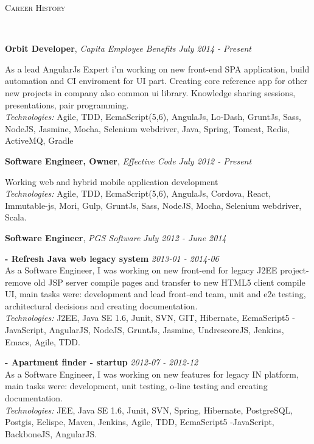 \documentclass[9pt]{article}
\newenvironment{changemargin}[2]{%
  \begin{list}{}{%
      \setlength{\topsep}{0pt}%
      \setlength{\leftmargin}{#1}%
      \setlength{\rightmargin}{#2}%
      \setlength{\listparindent}{\parindent}%
      \setlength{\itemindent}{\parindent}%
      \setlength{\parsep}{\parskip}%
    }%
  \item[]}{\end{list}
}
\newcommand{\lineover}{
  \begin{changemargin}{-0.05in}{-0.05in}
    \vspace*{-8pt}
    \hrulefill \\
    \vspace*{-2pt}
  \end{changemargin}
}
\newcommand{\header}[1]{
	\begin{changemargin}{-0.5in}{-0.5in}
		\scshape{#1}\\
  	\lineover
	\end{changemargin}
}
\newcommand{\jobtitle}[3]{
	\textbf{#1}, \emph{#2} \hfill \emph{#3}\\
}
\newcommand{\jobdescription}[1]{
	\begin{changemargin}{0.15in}{0.15in}
    \smallskip
		{#1}
    \medskip
	\end{changemargin}
}
\newenvironment{body} {
	\vspace*{-16pt}
	\begin{changemargin}{-0.25in}{-0.5in}
  }
	{\end{changemargin}
}
\begin{document}
\header{Career History}
\begin{body}
  \vspace{14pt}


  \jobtitle{Orbit Developer}{Capita Employee Benefits}{July 2014 - Present}
  \jobdescription{
    As a lead AngularJs Expert i'm working on new front-end SPA application, build automation and CI enviroment for UI part.
    Creating core reference app for other new projects in company also common ui library.
    Knowledge sharing sessions, presentations, pair programming.\\
    \emph{Technologies:} Agile, TDD, EcmaScript(5,6), AngulaJs, Lo-Dash, GruntJs, Sass, NodeJS, Jasmine, Mocha, Selenium webdriver, Java, Spring, Tomcat,  Redis, ActiveMQ, Gradle
  }

  \jobtitle{Software Engineer, Owner}{Effective Code}{July 2012 - Present}
  \jobdescription{
    Working web and hybrid mobile application development\\
    \emph{Technologies:} Agile, TDD, EcmaScript(5,6), AngulaJs, Cordova, React, Immutable-js, Mori, Gulp, GruntJs, Sass, NodeJS, Mocha, Selenium webdriver, Scala.
  }

  \jobtitle{Software Engineer}{PGS Software}{July 2012 - June 2014}
  \jobdescription{
    \medskip

    \textbf{- Refresh Java web legacy system}{} \hfill \emph{2013-01 - 2014-06}{} \\
    As a Software Engineer, I was working on new front-end for legacy J2EE project- remove old JSP server compile pages and transfer to new HTML5 client compile UI, main tasks were: development and lead front-end team, unit and e2e testing, architectural decisions and creating documentation.\\
    \emph{Technologies:} J2EE, Java SE 1.6, Junit, SVN, GIT, Hibernate, EcmaScript5 - JavaScript, AngularJS, NodeJS, GruntJs, Jasmine, UndrescoreJS, Jenkins, Emacs, Agile, TDD.
    \medskip

    \textbf{- Apartment finder - startup}{} \hfill \emph{2012-07 - 2012-12}{} \\
    As a Software Engineer, I was working on new features for legacy IN platform, main tasks were: development, unit testing, o-line testing and creating documentation.\\
    \emph{Technologies:} JEE, Java SE 1.6, Junit, SVN, Spring, Hibernate, PostgreSQL, Postgis, Eclispe, Maven, Jenkins, Agile, TDD, EcmaScript5 -JavaScript, BackboneJS, AngularJS.
  }


\end{body}
\end{document}
